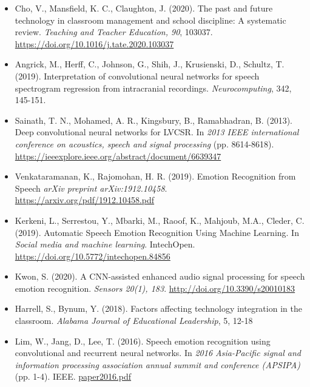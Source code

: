 \documentclass[12pt]{article}
\begin{document}
\begin{itemize}
\item Cho, V., Mansfield, K. C., Claughton, J. (2020). The past and future technology in classroom management and school discipline: A systematic review. \textit{Teaching and Teacher Education, 90}, 103037. \href{https://doi.org/10.1016/j.tate.2020.103037}{https://doi.org/10.1016/j.tate.2020.103037}

\item Angrick, M., Herff, C., Johnson, G., Shih, J., Krusienski, D., Schultz, T. (2019). Interpretation of convolutional neural networks for speech spectrogram regression from intracranial recordings. \textit{Neurocomputing}, 342, 145-151.

\item Sainath, T. N., Mohamed, A. R., Kingsbury, B., Ramabhadran, B. (2013). Deep convolutional neural networks for LVCSR. In \textit{2013 IEEE international conference on acoustics, speech and signal processing} (pp. 8614-8618). \tab \href{https://ieeexplore.ieee.org/abstract/document/6639347}{https://ieeexplore.ieee.org/abstract/document/6639347}

\item Venkataramanan, K., Rajomohan, H. R. (2019). Emotion Recognition from Speech \textit{arXiv preprint arXiv:1912.10458}. \href{https://arxiv.org/pdf/1912.10458.pdf}{https://arxiv.org/pdf/1912.10458.pdf}

\item Kerkeni, L., Serrestou, Y., Mbarki, M., Raoof, K., Mahjoub, M.A., Cleder, C. (2019). Automatic Speech Emotion Recognition Using Machine Learning. In \textit{Social media and machine learning}. IntechOpen. \href{https://doi.org/10.5772/intechopen.84856}{https://doi.org/10.5772/intechopen.84856}

\item Kwon, S. (2020). A CNN-assisted enhanced audio signal processing for speech emotion recognition. \textit{Sensors 20(1), 183}. \href{http://doi.org/10.3390/s20010183}{http://doi.org/10.3390/s20010183}

\item Harrell, S., Bynum, Y. (2018). Factors affecting technology integration in the classroom. \textit{Alabama Journal of Educational Leadership}, 5, 12-18

\item Lim, W., Jang, D., Lee, T. (2016). Speech emotion recognition using convolutional and recurrent neural networks. In \textit{2016 Asia-Pacific signal and information processing association annual summit and conference (APSIPA)} (pp. 1-4). IEEE. \href{http://www.apsipa.org/proceedings_2016/HTML/paper2016/137.pdf}{paper2016.pdf}


\end{itemize}
\end{document}
